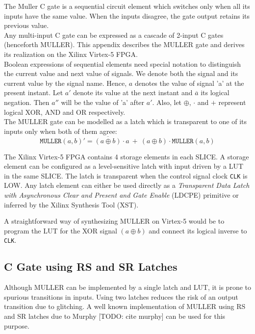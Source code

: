 The Muller C gate is a sequential circuit element which switches only when all its inputs have
the same value.
When the inputs disagree, the gate output retains its previous value.
\\
Any multi-input C gate can be expressed as a cascade of 2-input C gates
(henceforth MULLER).
This appendix describes the MULLER gate and derives its realization on 
the Xilinx Virtex-5 FPGA.
\\

Boolean expressions of sequential elements need special notation to distinguish the
current value and next value of signals. 
We denote both the signal and its current value by the signal name. 
Hence, $a$ denotes the value of signal 'a' at the present instant. 
Let $a'$ denote its value at the next instant and $\overline{a}$ its
logical negation. Then $a''$ will be the value of 'a' after $a'$.
Also, let $\oplus$, $\cdot$ and $+$ represent logical XOR, AND and OR respectively.
\\

The MULLER gate can be modelled as a latch which is transparent to one of its
inputs only when both of them agree:
\begin{equation} \label{eq:muller_c}
	\texttt{MULLER}(a,b)' = 
	\overline{(a \oplus b)} \cdot a\ +\ (a \oplus b) \cdot \texttt{MULLER}(a,b)
\end{equation}

The Xilinx Virtex-5 FPGA contains 4 storage elements in each SLICE.
A storage element can be configured as a level-sensitive latch with input
driven by a LUT in the same SLICE. The latch is transparent when the control
signal clock \texttt{CLK} is LOW. Any latch element can either be used directly
as a 
\textsl{Transparent Data Latch with Asynchronous Clear and Present and Gate
Enable} (LDCPE) primitive or inferred by the Xilinx Synthesis Tool (XST).

A straightforward way of synthesizing MULLER on Virtex-5 would be to program
the LUT for the XOR signal $(a \oplus b)$ and connect its logical inverse to
\texttt{CLK}.

\subsection{C Gate using RS and SR Latches}
Although MULLER can be implemented by a single latch and LUT, it is prone
to spurious transitions in inputs. 
Using two latches reduces the risk of an output transition due to glitching.
A well known implementation of MULLER using RS and SR latches due to Murphy
[TODO: cite murphy] can be used for this purpose.

